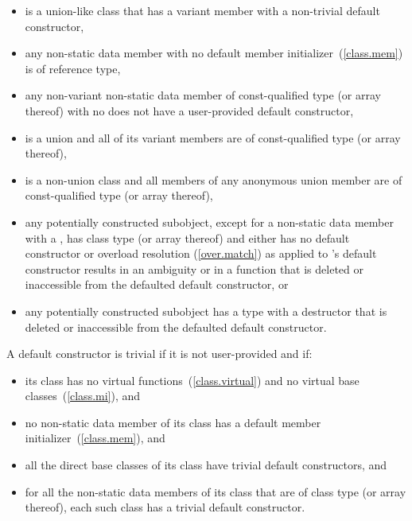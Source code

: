 \begin{itemize}
\item {} is a union-like class that has a variant
  member with a non-trivial default constructor,

\item any non-static data member with no default member initializer~(\ref{class.mem}) is
of reference type,

\item any non-variant non-static data member of const-qualified type (or array
thereof) with no  does not have a user-provided default constructor,

\item {} is a union and all of its variant members are of const-qualified
type (or array thereof),

\item {} is a non-union class and all members of any anonymous union member are
of const-qualified type (or array thereof),

\item any potentially constructed subobject, except for a non-static data member
with a , has
class type  (or array thereof) and either 
has no default constructor or overload resolution
(\ref{over.match}) as applied to 's default
constructor results in an ambiguity or in a function that is deleted or
inaccessible from the defaulted default constructor, or

\item any potentially constructed subobject has a type
with a destructor that is deleted or inaccessible from the defaulted default
constructor.
\end{itemize}

A default constructor is
trivial
if it is not user-provided and if:

\begin{itemize}
\item
its class has no virtual functions~(\ref{class.virtual}) and no virtual base
classes~(\ref{class.mi}), and

\item no non-static data member of its class has
a default member initializer~(\ref{class.mem}), and

\item
all the direct base classes of its class have trivial default constructors, and

\item
for all the non-static data members of its class that are of class
type (or array thereof), each such class has a trivial default constructor.
\end{itemize}

